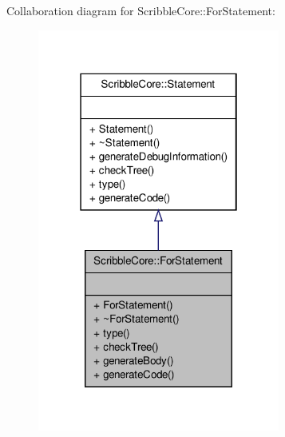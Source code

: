 Collaboration diagram for Scribble\-Core\-:\-:For\-Statement\-:
\nopagebreak
\begin{figure}[H]
\begin{center}
\leavevmode
\includegraphics[width=226pt]{class_scribble_core_1_1_for_statement__coll__graph}
\end{center}
\end{figure}
